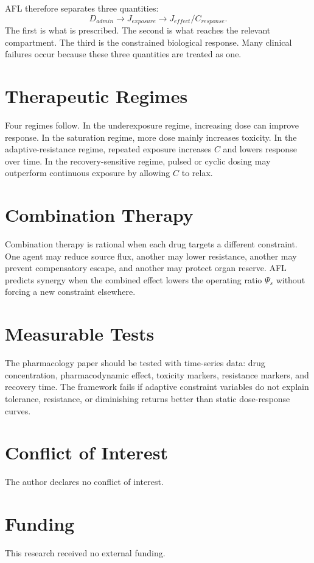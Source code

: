 \documentclass[11pt]{article}
\begin{document}
AFL therefore separates three quantities:
\begin{equation}
D_{admin} \rightarrow J_{exposure} \rightarrow J_{effect}/C_{response}.
\end{equation}
The first is what is prescribed. The second is what reaches the relevant compartment. The third is the constrained biological response. Many clinical failures occur because these three quantities are treated as one.

\section{Therapeutic Regimes}
Four regimes follow. In the underexposure regime, increasing dose can improve response. In the saturation regime, more dose mainly increases toxicity. In the adaptive-resistance regime, repeated exposure increases $C$ and lowers response over time. In the recovery-sensitive regime, pulsed or cyclic dosing may outperform continuous exposure by allowing $C$ to relax.

\section{Combination Therapy}
Combination therapy is rational when each drug targets a different constraint. One agent may reduce source flux, another may lower resistance, another may prevent compensatory escape, and another may protect organ reserve. AFL predicts synergy when the combined effect lowers the operating ratio $\Psi_s$ without forcing a new constraint elsewhere.

\section{Measurable Tests}
The pharmacology paper should be tested with time-series data: drug concentration, pharmacodynamic effect, toxicity markers, resistance markers, and recovery time. The framework fails if adaptive constraint variables do not explain tolerance, resistance, or diminishing returns better than static dose-response curves.



\section*{Conflict of Interest} The author declares no conflict of interest.
\section*{Funding} This research received no external funding.
\end{document}
